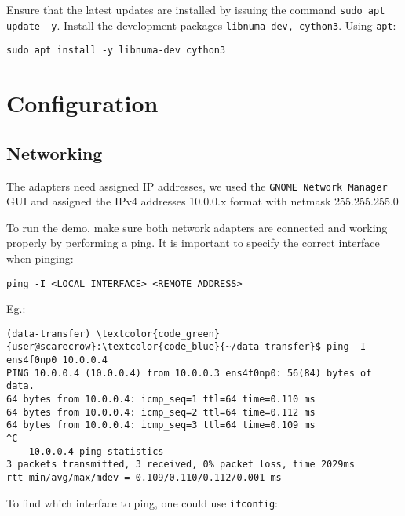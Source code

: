 \documentclass[a4paper,onecolumn]{article}
\begin{document}
Ensure that the latest updates are installed by issuing the command \verb|sudo apt update -y|. Install the development packages \verb|libnuma-dev, cython3|. Using \verb|apt|:

\begin{verbatim}
sudo apt install -y libnuma-dev cython3
\end{verbatim}


\section{Configuration}

\subsection{Networking}
The adapters need assigned IP addresses, we used the \verb|GNOME Network Manager| GUI and assigned the IPv4 addresses 10.0.0.x format with netmask 255.255.255.0

To run the demo, make sure both network adapters are connected and working properly by performing a ping. It is important to specify the correct interface when pinging:

\begin{verbatim}
ping -I <LOCAL_INTERFACE> <REMOTE_ADDRESS>
\end{verbatim}

Eg.:
\begin{Verbatim}[commandchars=\\\{\}]
(data-transfer) \textcolor{code_green}{user@scarecrow}:\textcolor{code_blue}{~/data-transfer}$ ping -I ens4f0np0 10.0.0.4
PING 10.0.0.4 (10.0.0.4) from 10.0.0.3 ens4f0np0: 56(84) bytes of data.
64 bytes from 10.0.0.4: icmp_seq=1 ttl=64 time=0.110 ms
64 bytes from 10.0.0.4: icmp_seq=2 ttl=64 time=0.112 ms
64 bytes from 10.0.0.4: icmp_seq=3 ttl=64 time=0.109 ms
^C
--- 10.0.0.4 ping statistics ---
3 packets transmitted, 3 received, 0% packet loss, time 2029ms
rtt min/avg/max/mdev = 0.109/0.110/0.112/0.001 ms
\end{Verbatim}

\pagebreak
To find which interface to ping, one could use \verb|ifconfig|:
\end{document}

